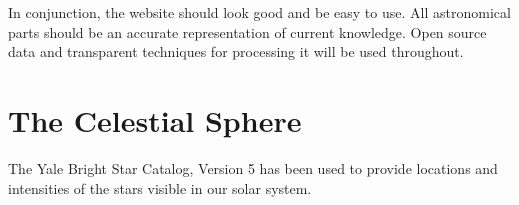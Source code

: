 \documentclass[11pt]{article}
\begin{document}
In conjunction, the website should look good and be easy to use. All astronomical parts should be an accurate representation of current knowledge. Open source data and transparent techniques for processing it will be used throughout.

\section{The Celestial Sphere}
The Yale Bright Star Catalog, Version 5 has been used to provide locations and intensities of the stars visible in our solar system.


 
\end{document}
